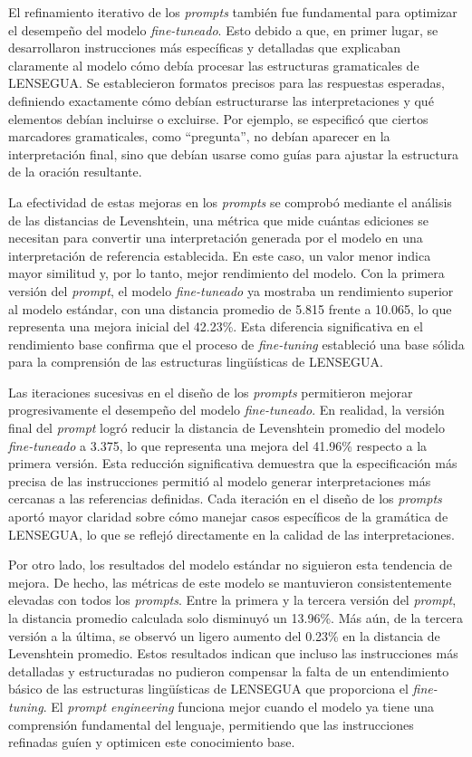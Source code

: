 El refinamiento iterativo de los \textit{prompts} también fue fundamental para optimizar el desempeño del modelo \textit{fine-tuneado}. Esto debido a que, en primer lugar, se desarrollaron instrucciones más específicas y detalladas que explicaban claramente al modelo cómo debía procesar las estructuras gramaticales de LENSEGUA. Se establecieron formatos precisos para las respuestas esperadas, definiendo exactamente cómo debían estructurarse las interpretaciones y qué elementos debían incluirse o excluirse. Por ejemplo, se especificó que ciertos marcadores gramaticales, como “pregunta”, no debían aparecer en la interpretación final, sino que debían usarse como guías para ajustar la estructura de la oración resultante.

La efectividad de estas mejoras en los \textit{prompts} se comprobó mediante el análisis de las distancias de Levenshtein, una métrica que mide cuántas ediciones se necesitan para convertir una interpretación generada por el modelo en una interpretación de referencia establecida. En este caso, un valor menor indica mayor similitud y, por lo tanto, mejor rendimiento del modelo. Con la primera versión del \textit{prompt}, el modelo \textit{fine-tuneado} ya mostraba un rendimiento superior al modelo estándar, con una distancia promedio de 5.815 frente a 10.065, lo que representa una mejora inicial del 42.23\%. Esta diferencia significativa en el rendimiento base confirma que el proceso de \textit{fine-tuning} estableció una base sólida para la comprensión de las estructuras lingüísticas de LENSEGUA.

Las iteraciones sucesivas en el diseño de los \textit{prompts} permitieron mejorar progresivamente el desempeño del modelo \textit{fine-tuneado}. En realidad, la versión final del \textit{prompt} logró reducir la distancia de Levenshtein promedio del modelo \textit{fine-tuneado} a 3.375, lo que representa una mejora del 41.96\% respecto a la primera versión. Esta reducción significativa demuestra que la especificación más precisa de las instrucciones permitió al modelo generar interpretaciones más cercanas a las referencias definidas. Cada iteración en el diseño de los \textit{prompts} aportó mayor claridad sobre cómo manejar casos específicos de la gramática de LENSEGUA, lo que se reflejó directamente en la calidad de las interpretaciones.

Por otro lado, los resultados del modelo estándar no siguieron esta tendencia de mejora. De hecho, las métricas de este modelo se mantuvieron consistentemente elevadas con todos los \textit{prompts}. Entre la primera y la tercera versión del \textit{prompt}, la distancia promedio calculada solo disminuyó un 13.96\%. Más aún, de la tercera versión a la última, se observó un ligero aumento del 0.23\% en la distancia de Levenshtein promedio. Estos resultados indican que incluso las instrucciones más detalladas y estructuradas no pudieron compensar la falta de un entendimiento básico de las estructuras lingüísticas de LENSEGUA que proporciona el \textit{fine-tuning}. El \textit{prompt engineering} funciona mejor cuando el modelo ya tiene una comprensión fundamental del lenguaje, permitiendo que las instrucciones refinadas guíen y optimicen este conocimiento base.

